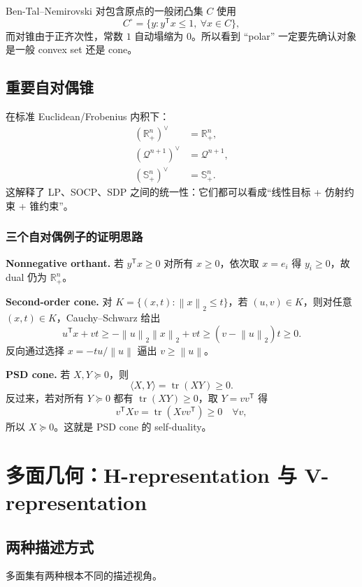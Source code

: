 \documentclass[11pt,a4paper,openany]{ctexrep}
\theoremstyle{definition}
\newcommand{\R}{\mathbb{R}}
\newcommand{\norm}[1]{\left\lVert #1\right\rVert}
\newcommand{\transpose}{\mathsf{T}}
\begin{document}
\begin{warningbox}
Ben-Tal--Nemirovski 对包含原点的一般闭凸集 $C$ 使用
\[
C^\circ=\{y:y^\transpose x\le1,\ \forall x\in C\},
\]
而对锥由于正齐次性，常数 $1$ 自动塌缩为 $0$。所以看到 ``polar'' 一定要先确认对象是一般 convex set 还是 cone。\cite[Appendix~B.2.7]{bental}
\end{warningbox}

\section{重要自对偶锥}
在标准 Euclidean/Frobenius 内积下：
\begin{align*}
(\R_+^n)^{\vee}&=\R_+^n,\\
(\mathcal Q^{n+1})^{\vee}&=\mathcal Q^{n+1},\\
(\mathbb S_+^n)^{\vee}&=\mathbb S_+^n.
\end{align*}
这解释了 LP、SOCP、SDP 之间的统一性：它们都可以看成“线性目标 + 仿射约束 + 锥约束”。\cite[\S2.6]{boyd}\cite[Lecture~1--3]{bental}\cite[Ch.~6]{luenberger}


\subsection{三个自对偶例子的证明思路}
\textbf{Nonnegative orthant.} 若 $y^\transpose x\ge0$ 对所有 $x\ge0$，依次取 $x=e_i$ 得 $y_i\ge0$，故 dual 仍为 $\R_+^n$。

\textbf{Second-order cone.} 对 $K=\{(x,t):\norm{x}_2\le t\}$，若 $(u,v)\in K$，则对任意 $(x,t)\in K$，Cauchy--Schwarz 给出
\[
u^\transpose x+vt\ge-\norm{u}_2\norm{x}_2+vt\ge(v-\norm{u}_2)t\ge0.
\]
反向通过选择 $x=-t u/\norm{u}$ 逼出 $v\ge\norm{u}$。

\textbf{PSD cone.} 若 $X,Y\succeq0$，则
\[
\langle X,Y\rangle=\operatorname{tr}(XY)\ge0.
\]
反过来，若对所有 $Y\succeq0$ 都有 $\operatorname{tr}(XY)\ge0$，取 $Y=vv^\transpose$ 得
\[
v^\transpose Xv=\operatorname{tr}(Xvv^\transpose)\ge0\quad\forall v,
\]
所以 $X\succeq0$。这就是 PSD cone 的 self-duality。\cite[Appendix~A.8]{bental}

\chapter{多面几何：H-representation 与 V-representation}

\section{两种描述方式}
多面集有两种根本不同的描述视角。
\end{document}
